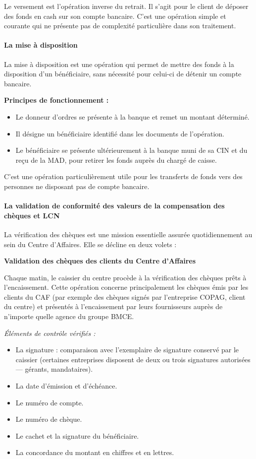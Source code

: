 \documentclass[12pt,a4paper]{report}
\begin{document}
Le versement est l'opération inverse du retrait. Il s'agit pour le client de déposer des fonds en cash sur son compte bancaire. C'est une opération simple et courante qui ne présente pas de complexité particulière dans son traitement.

\paragraph{La mise à disposition}

La mise à disposition est une opération qui permet de mettre des fonds à la disposition d'un bénéficiaire, sans nécessité pour celui-ci de détenir un compte bancaire.

\medskip\textbf{Principes de fonctionnement :}
\begin{itemize}
  \item Le donneur d'ordres se présente à la banque et remet un montant déterminé.
  \item Il désigne un bénéficiaire identifié dans les documents de l'opération.
  \item Le bénéficiaire se présente ultérieurement à la banque muni de sa CIN et du reçu de la MAD, pour retirer les fonds auprès du chargé de caisse.
\end{itemize}

C'est une opération particulièrement utile pour les transferts de fonds vers des personnes ne disposant pas de compte bancaire.

\paragraph{La validation de conformité des valeurs de la compensation des chèques et LCN}

La vérification des chèques est une mission essentielle assurée quotidiennement au sein du Centre d'Affaires. Elle se décline en deux volets :

\medskip\textbf{Validation des chèques des clients du Centre d'Affaires}

Chaque matin, le caissier du centre procède à la vérification des chèques prêts à l'encaissement. Cette opération concerne principalement les chèques émis par les clients du CAF (par exemple des chèques signés par l'entreprise COPAG, client du centre) et présentés à l'encaissement par leurs fournisseurs auprès de n'importe quelle agence du groupe BMCE.

\medskip\textit{Éléments de contrôle vérifiés :}
\begin{itemize}
  \item La signature : comparaison avec l'exemplaire de signature conservé par le caissier (certaines entreprises disposent de deux ou trois signatures autorisées --- gérants, mandataires).
  \item La date d'émission et d'échéance.
  \item Le numéro de compte.
  \item Le numéro de chèque.
  \item Le cachet et la signature du bénéficiaire.
  \item La concordance du montant en chiffres et en lettres.
\end{itemize}
\end{document}
